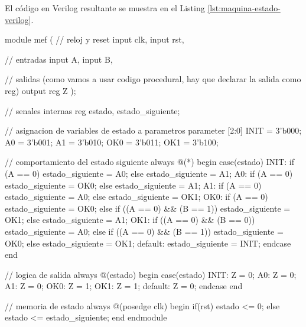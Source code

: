 El código en Verilog resultante se muestra en el Listing \ref{lst:maquina-estado-verilog}.

\begin{mycode}[style=verilogstyle, caption={Máquina de estado en Verilog.}, label=lst:maquina-estado-verilog]
module mef (
            // reloj y reset
            input clk,
            input rst,

            // entradas
            input A,
            input B,

            // salidas (como vamos a usar codigo procedural, hay que declarar la salida como reg)
            output reg Z
           );

// senales internas
reg estado, estado_siguiente;

// asignacion de variables de estado a parametros
parameter [2:0] INIT = 3'b000;
                A0 = 3'b001;
                A1 = 3'b010;
                OK0 = 3'b011;
                OK1 = 3'b100;

// comportamiento del estado siguiente
always @(*) begin
    case(estado)
        INIT: if (A == 0) estado_siguiente = A0;
              else estado_siguiente = A1;
        A0: if (A == 0) estado_siguiente = OK0;
            else estado_siguiente = A1;
        A1: if (A == 0) estado_siguiente = A0;
            else estado_siguiente = OK1;
        OK0: if (A == 0) estado_siguiente = OK0;
             else if ((A == 0) && (B == 1)) estado_siguiente = OK1;
             else estado_siguiente = A1;
        OK1: if ((A == 0) && (B == 0))             estado_siguiente = A0;
        else if ((A == 0) && (B == 1)) estado_siguiente = OK0;
        else estado_siguiente = OK1;
        default: estado_siguiente = INIT;
    endcase
end

// logica de salida
always @(estado) begin
    case(estado)
        INIT: Z = 0;
        A0: Z = 0;
        A1: Z = 0;
        OK0: Z = 1;
        OK1: Z = 1;
        default: Z = 0;
    endcase
end

// memoria de estado
always @(posedge clk) begin
    if(rst)
        estado <= 0;
    else
        estado <= estado_siguiente;
end
endmodule
\end{mycode}